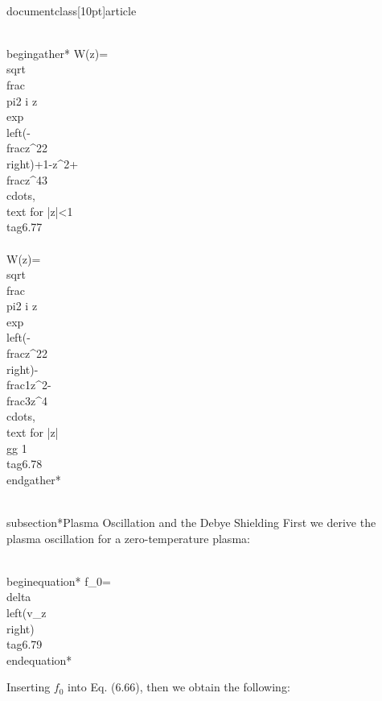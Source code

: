 \\documentclass[10pt]{article}
\begin{document}
{{{{\\begin{gather*}
W(z)=\\sqrt{\\frac{\\pi}{2}} i z \\exp \\left(-\\frac{z^{2}}{2}\\right)+1-z^{2}+\\frac{z^{4}}{3} \\cdots, \\text { for }|z|<1  \\tag{6.77}\\\\
W(z)=\\sqrt{\\frac{\\pi}{2}} i z \\exp \\left(-\\frac{z^{2}}{2}\\right)-\\frac{1}{z^{2}}-\\frac{3}{z^{4}} \\cdots, \\text { for }|z| \\gg 1 \\tag{6.78}
\\end{gather*}


\\subsection*{Plasma Oscillation and the Debye Shielding}
First we derive the plasma oscillation for a zero-temperature plasma:


\\begin{equation*}
f_{0}=\\delta\\left(v_{z}\\right) \\tag{6.79}
\\end{equation*}


Inserting $f_{0}$ into Eq. (6.66), then we obtain the following:


}}}}
\end{document}
